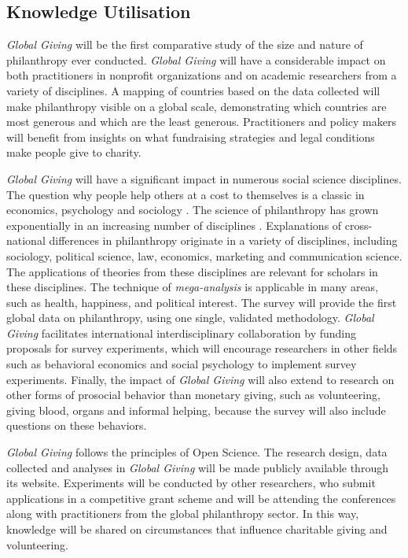 \documentclass[twocolumn, serif, rga, numeric]{jote-article}
\begin{document}
 {}\subsection*{Knowledge Utilisation}

\emph{Global Giving} will be the first comparative study of the size and nature of philanthropy ever conducted. \emph{Global Giving} will have a considerable impact on both practitioners in nonprofit organizations and on academic researchers from a variety of disciplines. A mapping of countries based on the data collected will make philanthropy visible on a global scale, demonstrating which countries are most generous and which are the least generous. Practitioners and policy makers will benefit from insights on what fundraising strategies and legal conditions make people give to charity.

\emph{Global Giving} will have a significant impact in numerous social science disciplines. The question why people help others at a cost to themselves is a classic in economics, psychology and sociology \cite{Comte1858, Smith1759}. The science of philanthropy has grown exponentially \cite{Smith2016, Bekkers2013a} in an increasing number of disciplines \cite{Katz1999}. Explanations of cross-national differences in philanthropy originate in a variety of disciplines, including sociology, political science, law, economics, marketing and communication science. The applications of theories from these disciplines are relevant for scholars in these disciplines. The technique of \emph{mega-analysis}\cite{Wilhelm2006} is applicable in many areas, such as health, happiness, and political interest. The survey will provide the first global data on philanthropy, using one single, validated methodology. \emph{Global Giving}
facilitates international interdisciplinary collaboration by funding proposals for survey experiments, which will encourage researchers in other fields such as behavioral economics and social psychology to implement survey experiments. Finally, the impact of \emph{Global Giving} will also extend to research on other forms of prosocial behavior than monetary giving, such as volunteering, giving blood, organs and informal helping, because the survey will also include questions on these behaviors.

\emph{Global Giving} follows the principles of Open Science. The research design, data collected and analyses in \emph{Global Giving}
will be made publicly available through its website. Experiments will be conducted by other researchers, who submit applications in a competitive grant scheme and will be attending the conferences along with practitioners from the global philanthropy sector. In this way, knowledge will be shared on circumstances that influence charitable giving and volunteering.
\end{document}
